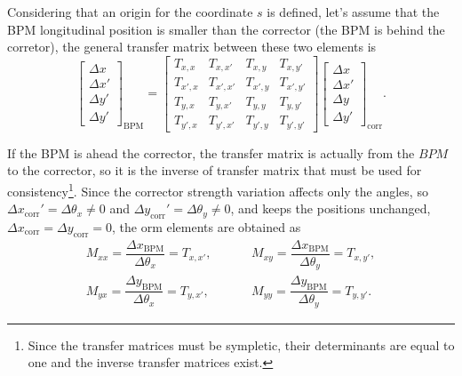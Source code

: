 Considering that an origin for the coordinate $s$ is defined, let's assume that the BPM longitudinal position is smaller than the corrector (the BPM is behind the corretor), the general transfer matrix between these two elements is
\begin{equation}
    \begin{bmatrix}
    \Delta x \\
    \Delta x' \\
    \Delta y' \\
    \Delta y'
    \end{bmatrix}_{\mathrm{BPM}}  =
    \begin{bmatrix}
    T_{x, x} & T_{x, x'} & T_{x, y} & T_{x, y'} \\
    T_{x', x} & T_{x', x'} & T_{x', y} & T_{x', y'} \\
    T_{y, x} & T_{y, x'} & T_{y, y} & T_{y, y'} \\
    T_{y', x} & T_{y', x'} & T_{y', y} & T_{y', y'} 
    \end{bmatrix} 
    \begin{bmatrix}
    \Delta x \\
    \Delta x' \\
    \Delta y \\
    \Delta y'
    \end{bmatrix}_{\mathrm{corr}}.
\end{equation}

If the BPM is ahead the corrector, the transfer matrix is actually from the $BPM$ to the corrector, so it is the inverse of transfer matrix that must be used for consistency\footnote{Since the transfer matrices must be sympletic, their determinants are equal to one and the inverse transfer matrices exist.}. Since the corrector strength variation affects only the angles, so $\Delta x_{\mathrm{corr}}' = \Delta \theta_x \neq 0$ and $\Delta y_{\mathrm{corr}}' = \Delta \theta_y \neq 0$, and keeps the positions unchanged, $\Delta x_{\mathrm{corr}} = \Delta y_{\mathrm{corr}} = 0$, the \gls{orm} elements are obtained as 
\begin{align*}
    M_{xx} = \dfrac{\Delta x_{\mathrm{BPM}}}{\Delta \theta_x} = T_{x, x'}, & \hspace{1cm} M_{xy} = \dfrac{\Delta x_{\mathrm{BPM}}}{\Delta \theta_y} = T_{x, y'}, \\
    M_{yx} = \dfrac{\Delta y_{\mathrm{BPM}}}{\Delta \theta_x} = T_{y, x'}, & \hspace{1cm} M_{yy} = \dfrac{\Delta y_{\mathrm{BPM}}}{\Delta \theta_y} = T_{y, y'}.
\end{align*}

